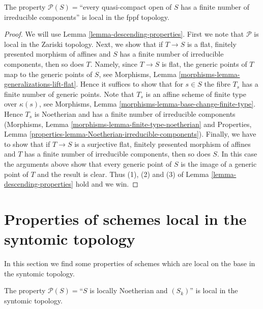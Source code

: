 \begin{lemma}
\label{lemma-locally-finite-nr-irred-local-fppf}
The property $\mathcal{P}(S) =$``every quasi-compact open of $S$
has a finite number of irreducible components'' is local
in the fppf topology.
\end{lemma}

\begin{proof}
We will use Lemma \ref{lemma-descending-properties}. First we note that
$\mathcal{P}$ is local in the Zariski topology.
Next, we show that if $T \to S$ is a flat, finitely presented
morphism of affines and $S$ has a finite number of irreducible
components, then so does $T$. Namely, since $T \to S$ is flat,
the generic points of $T$ map to the generic points of $S$, see
Morphisms, Lemma \ref{morphisms-lemma-generalizations-lift-flat}.
Hence it suffices to show that for $s \in S$ the fibre $T_s$
has a finite number of generic points. Note that $T_s$ is an
affine scheme of finite type over $\kappa(s)$, see
Morphisms, Lemma \ref{morphisms-lemma-base-change-finite-type}.
Hence $T_s$ is Noetherian and has a finite number of irreducible components
(Morphisms, Lemma \ref{morphisms-lemma-finite-type-noetherian} and
Properties, Lemma \ref{properties-lemma-Noetherian-irreducible-components}).
Finally, we have to show that if $T \to S$ is a surjective
flat, finitely presented morphism of affines and $T$ has a finite
number of irreducible components, then so does $S$. In this case
the arguments above show that every generic point of $S$ is the
image of a generic point of $T$ and the result is clear.
Thus (1), (2) and (3) of Lemma \ref{lemma-descending-properties} hold
and we win.
\end{proof}




\section{Properties of schemes local in the syntomic topology}
\label{section-descending-properties-syntomic}

\noindent
In this section we find some properties of schemes which are local on the base
in the syntomic topology.

\begin{lemma}
\label{lemma-Sk-local-syntomic}
The property $\mathcal{P}(S) =$``$S$ is locally Noetherian and $(S_k)$''
is local in the syntomic topology.
\end{lemma}

